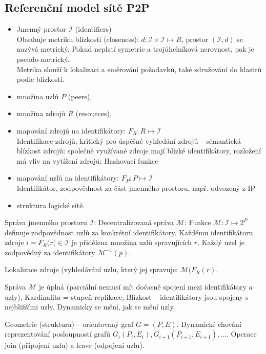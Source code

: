 \documentclass[a4paper, 11pt]{report}
\begin{document}
\subsection{Referenční model sítě P2P}
\begin{itemize}
	\item Jmenný prostor $\mathcal{I}$ (identifiers) \\
	Obsahuje metriku blízkosti (closeness): $d: \mathcal{I} \times \mathcal{I} \mapsto R$, prostor $(\mathcal{I}, d)$ se nazývá metrický. Pokud neplatí symetrie a trojúhelníková nerovnost, pak je pseudo-metrický.\\
	
	Metrika slouží k lokalizaci a směrování požadavků, také sdružování do klastrů podle blízkosti.
	\item množina uzlů $P$ (peers),
	\item množina zdrojů $R$ (resources),
	\item mapování zdrojů na identifikátory: $F_R: R \mapsto \mathcal{I}$\\
	Identifikace zdrojů, kritický pro úspěšné vyhledání zdrojů -- sémantická blízkost zdrojů: společně využívané zdroje mají blízké identifikátory, rozložení má vliv na vytížení zdrojů; Hashovací funkce
	\item mapování uzlů na identifikátory: $F_P: P \mapsto \mathcal{I}$\\
	Identifikátor, zodpovědnost za část jmenného prostoru, např. odvozený z IP
	\item struktura logické sítě.
\end{itemize}

Správa jmenného prostoru $\mathcal{I}$: Decentralizovaná správa $\mathcal{M}$: Funkce $\mathcal{M}: \mathcal{I} \mapsto 2^P$ definuje zodpovědnost uzlů za konkrétní identifikátory. Každému identifikátoru zdroje $i = F_R(r( \in \mathcal{I}$ je přidělena množina uzlů spravujících $r$. Každý uzel je zodpovědný za identifikátory $\mathcal{M}^{-1}(p)$.

Lokalizace zdroje (vyhledávání uzlu, který jej spravuje: $\mathcal{M}(F_R(r)$.

Správa $\mathcal{M}$ je úplná (parciální nemusí mít dočasně spojení mezi identifikátory a uzly), Kardinalita = stupeň replikace, Blízkost -- identifikátory jsou spojeny s nejbližšími uzly. Dynamicky se mění, jak se mění uzly.

Geometrie (struktura) -- orientovaný graf $G=(P, E)$. Dynamické chování reprezentování posloupností grafů $G_i(P_i, E_i), G_{i+1}(P_{i+1}, E_{i+1}), \dots$. Operace join (připojení uzlu) a leave (odpojení uzlu).
\end{document}

